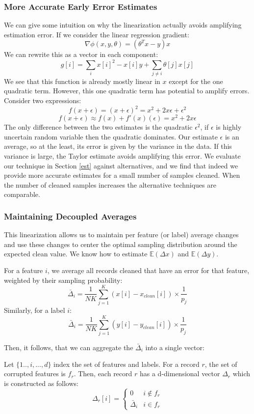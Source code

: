 \subsubsection{More Accurate Early Error Estimates}\label{acc}
We can give some intuition on why the linearization actually avoids amplifying estimation error.
If we consider the linear regression gradient:
\[
\nabla\phi(x,y,\theta) = (\theta^Tx - y)x
\]
We can rewrite this as a vector in each component:
\[
g[i] = \sum_{i} x[i]^2-x[i]y + \sum_{j \ne i} \theta[j]x[j]
\]
We see that this function is already mostly linear in $x$ except for the one quadratic term.
However, this one quadratic term has potential to amplify errors.
Consider two expressions:
\[
f(x+\epsilon) = (x+\epsilon)^2 = x^2 + 2x\epsilon + \epsilon^2
\]
\[
f(x+\epsilon) \approx f(x) + f'(x)(\epsilon) = x^2 + 2x\epsilon
\]
The only difference between the two estimates is the quadratic $\epsilon^2$, if $\epsilon$ is highly uncertain random variable then the quadratic dominates.
Our estimate $\epsilon$ is an average, so at the least, its error is given by the variance in the data.
If this variance is large, the Taylor estimate avoids amplifying this error.
We evaluate our technique in Section \ref{est} against alternatives, and we find that indeed we provide more accurate estimates for a small number of samples cleaned.
When the number of cleaned samples increases the alternative techniques are comparable.

\subsubsection{Maintaining Decoupled Averages}
This linearization allows us to maintain per feature (or label) average changes and use these changes to center the optimal sampling distribution around the expected clean value.
We know how to estimate $\mathbb{E}(\Delta x)$ and $\mathbb{E}(\Delta y)$.
\begin{lemma}
For a feature $i$, we average all records cleaned that have an error for that feature, weighted by their sampling probability:
\[
\bar{\Delta}_i = \frac{1}{NK}\sum_{j=1}^K (x[i]-x_{clean}[i])\times \frac{1}{p_j}
\]
Similarly, for a label $i$:
\[
\bar{\Delta}_i = \frac{1}{NK}\sum_{j=1}^K (y[i]-y_{clean}[i])\times \frac{1}{p_j}
\]
\end{lemma}

Then, it follows, that we can aggregate the $\bar{\Delta}_i$ into a single vector:
\begin{lemma}
Let $\{1..,i,...,d\}$ index the set of features and labels.
For a record $r$, the set of corrupted features is $f_r$.
Then, each record $r$ has a d-dimensional vector $\Delta_r$ which is constructed as follows:
\[
 \Delta_r[i] = \begin{cases} 0 & i \notin f_r \\ 
\bar{\Delta}_i & i \in f_r
\end{cases} 
\]
\end{lemma}

